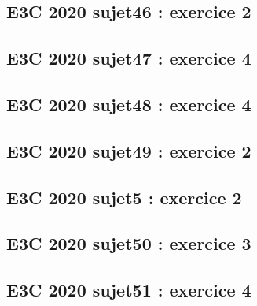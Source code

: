 \documentclass[lang=fr,edition=teacher,layout=sheet]{mxbook}
\begin{document}
\begingroup\endgroup
\par\bigskip
{}\subsection*{E3C 2020 sujet46 : exercice 2}
\begingroup\endgroup
\par\bigskip
{}\subsection*{E3C 2020 sujet47 : exercice 4}
\begingroup\endgroup
\par\bigskip
{}\subsection*{E3C 2020 sujet48 : exercice 4}
\begingroup\endgroup
\par\bigskip
{}\subsection*{E3C 2020 sujet49 : exercice 2}
\begingroup\endgroup
\par\bigskip
{}\subsection*{E3C 2020 sujet5 : exercice 2}
\begingroup\endgroup
\par\bigskip
{}\subsection*{E3C 2020 sujet50 : exercice 3}
\begingroup\endgroup
\par\bigskip
{}\subsection*{E3C 2020 sujet51 : exercice 4}
\end{document}
